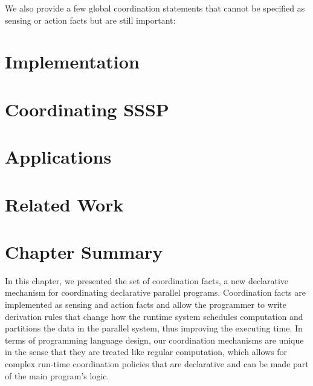 We also provide a few global coordination statements that cannot be specified
as sensing or action facts but are still important:


\section{Implementation}


\section{Coordinating SSSP}


\section{Applications}



\section{Related Work}\label{sec:coordination:related}

\section{Chapter Summary}

In this chapter, we presented the set of coordination facts, a new declarative
mechanism for coordinating declarative parallel programs. Coordination facts are
implemented as sensing and action facts and allow the programmer to write
derivation rules that change how the runtime system schedules computation and
partitions the data in the parallel system, thus improving the executing time.
In terms of programming language design, our coordination mechanisms are unique
in the sense that they are treated like regular computation, which allows for
complex run-time coordination policies that are declarative and can be made part
of the main program's logic.
